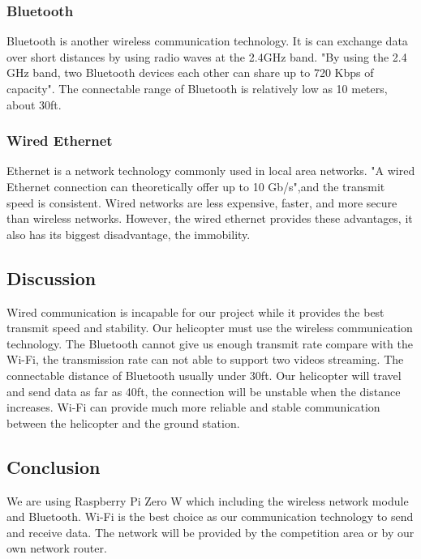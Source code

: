 \documentclass[letterpaper, 10, draftclsnofoot, onecolumn,compsoc]{IEEEtran}
\begin{document}
\subsubsection{Bluetooth}
Bluetooth is another wireless communication technology. It is can exchange data over short distances by using radio waves at the 2.4GHz band. "By using the 2.4 GHz band, two Bluetooth devices each other can share up to 720 Kbps of capacity".\cite{r8} The connectable range of Bluetooth is relatively low as 10 meters, about 30ft.

\subsubsection{Wired Ethernet}
Ethernet is a network technology commonly used in local area networks. "A wired Ethernet connection can theoretically offer up to 10 Gb/s",\cite{r7}and the transmit speed is consistent. Wired networks are less expensive, faster, and more secure than wireless networks. However, the wired ethernet provides these advantages, it also has its biggest disadvantage, the immobility.

\subsection{Discussion}
Wired communication is incapable for our project while it provides the best transmit speed and stability. Our helicopter must use the wireless communication technology. The Bluetooth cannot give us enough transmit rate compare with the Wi-Fi, the transmission rate can not able to support two videos streaming. The connectable distance of Bluetooth usually under 30ft. Our helicopter will travel and send data as far as 40ft, the connection will be unstable when the distance increases. Wi-Fi can provide much more reliable and stable communication between the helicopter and the ground station. 

\subsection{Conclusion}
We are using Raspberry Pi Zero W which including the wireless network module and Bluetooth. Wi-Fi is the best choice as our communication technology to send and receive data. The network will be provided by the competition area or by our own network router.

\vspace{2mm}
\raggedright


\end{document}
